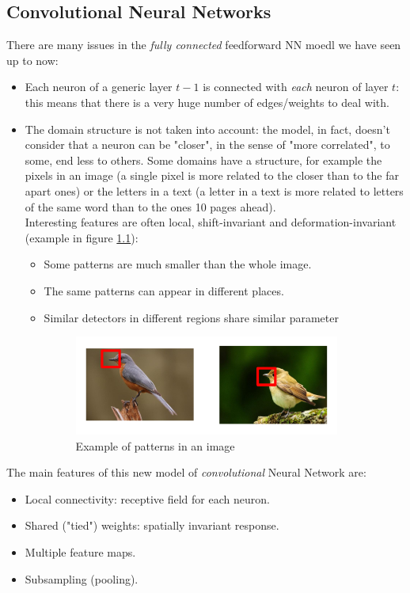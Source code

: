 \documentclass[12pt]{report}
\theoremstyle{plain}
\begin{document}
\begin{flushleft}
\chapter{Convolutional Neural Networks}

There are many issues in the \textit{fully connected} feedforward NN moedl we have seen up to now:
\begin{itemize}
	\item Each neuron of a generic layer $t-1$ is connected with \textit{each} neuron of layer $t$: this means that there is a very huge number of edges/weights to deal with.
	\item The domain structure is not taken into account: the model, in fact, doesn't consider that a neuron can be "closer", in the sense of "more correlated", to some, end less to others. Some domains have a structure, for example the pixels in an image (a single pixel is more related to the closer than to the far apart ones) or the letters in a text (a letter in a text is more related to letters of the same word than to the ones 10 pages ahead).\\
	Interesting features are often local, shift-invariant and deformation-invariant (example in figure \ref{fig:convNN_beaks}):
		\begin{itemize}
		\item Some patterns are much smaller than the whole image.
		\item The same patterns can appear in different places.
		\item Similar detectors in different regions share similar parameter
		\begin{figure}[!h]
			\centering
			\includegraphics[scale=1]{images/convNN_beaks.pdf}
			\caption{Example of patterns in an image}
			\label{fig:convNN_beaks}
		\end{figure}
	\end{itemize}
\end{itemize}    

The main features of this new model of \textit{convolutional} Neural Network are:
\begin{itemize}
	\item Local connectivity: receptive field for each neuron.
	\item Shared ("tied") weights: spatially invariant response.
	\item Multiple feature maps.
	\item Subsampling (pooling).
\end{itemize}


\end{flushleft}
\end{document}
